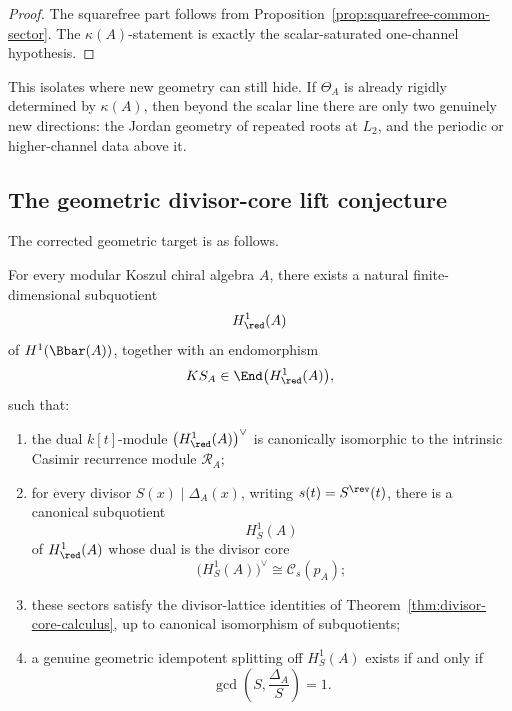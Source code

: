 \begin{proof}
The squarefree part follows from Proposition~\ref{prop:squarefree-common-sector}.
The \(\kappa(A)\)-statement is exactly the scalar-saturated one-channel hypothesis.
\end{proof}

\begin{remark}
This isolates where new geometry can still hide.
If \(\Theta_A\) is already rigidly determined by \(\kappa(A)\), then beyond the scalar line there are only two genuinely new directions:
the Jordan geometry of repeated roots at \(L_2\), and the periodic or higher-channel data above it.
\end{remark}

\subsection{The geometric divisor-core lift conjecture}

The corrected geometric target is as follows.

\begin{conjecture}
\ClaimStatusConjectured
\label{conj:geometric-divisor-core-lift}
For every modular Koszul chiral algebra \(A\), there exists a natural finite-dimensional subquotient
\[
H^1_{\red}(A)
\]
of \(H^1(\Bbar(A))\), together with an endomorphism
\[
KS_A\in \End\bigl(H^1_{\red}(A)\bigr),
\]
such that:
\begin{enumerate}[label=\textup{(\roman*)}]
\item the dual \(k[t]\)-module \(\bigl(H^1_{\red}(A)\bigr)^\vee\) is canonically isomorphic to the intrinsic Casimir recurrence module \(\mathcal R_A\);

\item for every divisor \(S(x)\mid \Delta_A(x)\), writing \(s(t)=S^{\rev}(t)\), there is a canonical subquotient
\[
H^1_S(A)
\]
of \(H^1_{\red}(A)\) whose dual is the divisor core
\[
\bigl(H^1_S(A)\bigr)^\vee \cong \mathcal C_s(p_A);
\]

\item these sectors satisfy the divisor-lattice identities of Theorem~\ref{thm:divisor-core-calculus}, up to canonical isomorphism of subquotients;

\item a genuine geometric idempotent splitting off \(H^1_S(A)\) exists if and only if
\[
\gcd\!\left(S,\frac{\Delta_A}{S}\right)=1.
\]
\end{enumerate}
\end{conjecture}

